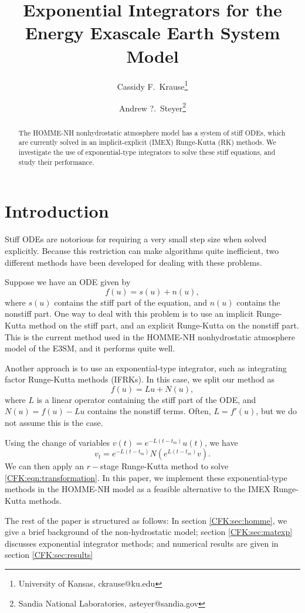 \documentclass{csri19}
\title{Exponential Integrators for the Energy Exascale Earth System Model}
\author{Cassidy F.\ Krause\thanks{University of Kansas, ckrause@ku.edu} \and Andrew ?.\ Steyer\thanks{Sandia National Laboratories,
asteyer@sandia.gov}}
\begin{document}
\maketitle

\begin{abstract}
The HOMME-NH nonhydrostatic atmosphere model has a system of stiff ODEs, which are currently solved in an implicit-explicit (IMEX) Runge-Kutta (RK) methods. We investigate the use of exponential-type integrators to solve these stiff equations, and study their performance.
\end{abstract}

\section{Introduction} \label{CFK:sec:intro}
Stiff ODEs are notorious for requiring a very small step size when solved explicitly. Because this restriction can make algorithms quite inefficient, two different methods have been developed for dealing with these problems. 

Suppose we have an ODE given by 
\[ f(u) = s(u) + n(u),\] where $s(u)$ contains the stiff part of the equation, and $n(u)$ contains the nonstiff part. 
One way to deal with this problem is to use an implicit Runge-Kutta method on the stiff part, and an explicit Runge-Kutta on the nonstiff part. 
This is the current method used in the HOMME-NH nonhydrostatic atmosphere model of the E3SM, and it performs quite well.

Another approach is to use an exponential-type integrator, such as integrating factor Runge-Kutta methods (IFRKs). In this case, we split our method as
\[ f(u) = Lu + N(u),\] where $L$ is a linear operator containing the stiff part of the ODE, and $N(u) = f(u) - Lu$ contains the nonstiff terms. Often, $L = f'(u)$, but we do not assume this is the case. 

Using the change of variables $v(t) = e^{-L(t-t_m)}u(t)$, we have
\begin{equation}\label{CFK:eqn:transformation}
v_t = e^{-L(t-t_m)}N(e^{L(t-t_m)}v).
\end{equation} 
We can then apply an $r-$stage Runge-Kutta method to solve \ref{CFK:eqn:transformation}. In this paper, we implement these exponential-type methods in the HOMME-NH model as a feasible alternative to the IMEX Runge-Kutta methods.

The rest of the paper is structured as follows: In section \ref{CFK:sec:homme}, we give a brief background of the non-hydrostatic model; 
section \ref{CFK:sec:matexp} discusses exponential integrator methods; and numerical results are given in section \ref{CFK:sec:results}
\end{document}

